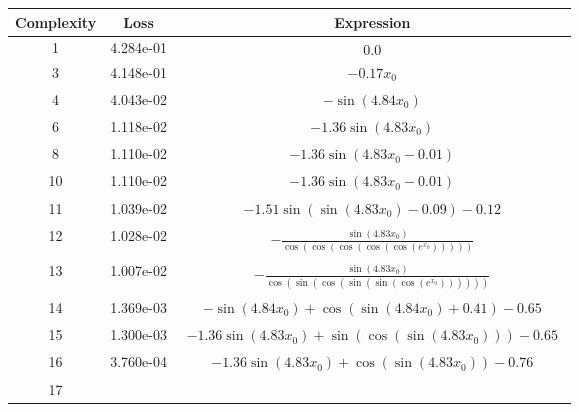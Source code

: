 \begin{center}
        \begin{tabular}{|c|c|c|}
        \hline
        Complexity & Loss & Expression \\
        \hline
        1 & 4.284e-01 & $\begin{aligned}0.0\end{aligned}$\\ \hline3 & 4.148e-01 & $\begin{aligned}- 0.17 x_{0}\end{aligned}$\\ \hline4 & 4.043e-02 & $\begin{aligned}- \sin{\left(4.84 x_{0} \right)}\end{aligned}$\\ \hline6 & 1.118e-02 & $\begin{aligned}- 1.36 \sin{\left(4.83 x_{0} \right)}\end{aligned}$\\ \hline8 & 1.110e-02 & $\begin{aligned}- 1.36 \sin{\left(4.83 x_{0} - 0.01 \right)}\end{aligned}$\\ \hline10 & 1.110e-02 & $\begin{aligned}- 1.36 \sin{\left(4.83 x_{0} - 0.01 \right)}\end{aligned}$\\ \hline11 & 1.039e-02 & $\begin{aligned}- 1.51 \sin{\left(\sin{\left(4.83 x_{0} \right)} - 0.09 \right)} - 0.12\end{aligned}$\\ \hline12 & 1.028e-02 & $\begin{aligned}- \frac{\sin{\left(4.83 x_{0} \right)}}{\cos{\left(\cos{\left(\cos{\left(\cos{\left(\cos{\left(e^{x_{0}} \right)} \right)} \right)} \right)} \right)}}\end{aligned}$\\ \hline13 & 1.007e-02 & $\begin{aligned}- \frac{\sin{\left(4.83 x_{0} \right)}}{\cos{\left(\sin{\left(\cos{\left(\sin{\left(\sin{\left(\cos{\left(e^{x_{0}} \right)} \right)} \right)} \right)} \right)} \right)}}\end{aligned}$\\ \hline14 & 1.369e-03 & $\begin{aligned}- \sin{\left(4.84 x_{0} \right)} + \cos{\left(\sin{\left(4.84 x_{0} \right)} + 0.41 \right)} - 0.65\end{aligned}$\\ \hline15 & 1.300e-03 & $\begin{aligned}- 1.36 \sin{\left(4.83 x_{0} \right)} + \sin{\left(\cos{\left(\sin{\left(4.83 x_{0} \right)} \right)} \right)} - 0.65\end{aligned}$\\ \hline16 & 3.760e-04 & $\begin{aligned}- 1.36 \sin{\left(4.83 x_{0} \right)} + \cos{\left(\sin{\left(4.83 x_{0} \right)} \right)} - 0.76\end{aligned}$\\ \hline17 & 
\end{tabular}
\end{center}
